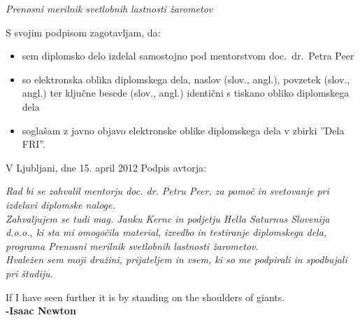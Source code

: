 \documentclass[oneside, a4paper, 12pt]{book}
\newcommand{\clearemptydoublepage}{\newpage{\pagestyle{empty}\cleardoublepage}}
\begin{document}
\vspace{0.5cm}
\emph{Prenosni merilnik svetlobnih lastnosti žarometov}

\vspace{1.5cm}
\noindent S svojim podpisom zagotavljam, da:
\begin{itemize}
	\item sem diplomsko delo izdelal samostojno pod mentorstvom 
		doc.\ dr.\ Petra Peer 

	\item	so elektronska oblika diplomskega dela, naslov (slov., angl.), povzetek (slov., angl.) ter ključne besede (slov., angl.) identični s tiskano obliko diplomskega dela
	\item soglašam z javno objavo elektronske oblike diplomskega dela v zbirki ''Dela FRI''.
\end{itemize}

\vspace{1cm}
\noindent V Ljubljani, dne 15. april 2012 \hfill Podpis avtorja:

\clearemptydoublepage

\thispagestyle{empty}\mbox{}\vfill\null\it%
Rad bi se zahvalil mentorju doc. dr. Petru Peer, za pomoč in svetovanje pri izdelavi diplomske naloge. \\
Zahvaljujem se tudi mag. Janku Kernc in podjetju Hella Saturnus Slovenija d.o.o., ki sta mi omogočila material, izvedbo in testiranje diplomskega dela, programa Prenosni merilnik svetlobnih lastnosti žarometov. \\
Hvaležen sem moji družini, prijateljem in vsem, ki so me podpirali in spodbujali pri študiju.
\rm\normalfont

\clearemptydoublepage

\thispagestyle{empty}\mbox{}{\textheight}\mbox{}\hfill\begin{minipage}{0.90\textwidth}%
\begin{flushright}
If I have seen further it is by standing on the shoulders of giants.\\
\textbf{-Isaac Newton}
\end{flushright}
\normalfont\end{minipage}
 
\clearemptydoublepage

\def\thepage{}%
\tableofcontents{}
\end{document}
